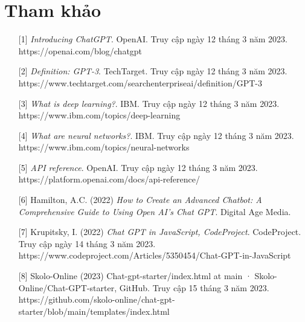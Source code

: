 \documentclass[a4paper, 12pt]{article}
\begin{document}
	\section{Tham khảo}
	\begin{itemize}
		\item[ {[1]} ] \textit{Introducing ChatGPT}. OpenAI. Truy cập ngày 12 tháng 3 năm 2023.\\ https://openai.com/blog/chatgpt 
		
		\item[ {[2]}] \textit{Definition: GPT-3}. TechTarget. Truy cập ngày 12 tháng 3 năm 2023.\\
		https://www.techtarget.com/searchenterpriseai/definition/GPT-3
		
		\item[{[3]}] \textit{What is deep learning?}. IBM. Truy cập ngày 12 tháng 3 năm 2023.\\
		https://www.ibm.com/topics/deep-learning
		
		\item[{[4]}] \textit{What are neural networks?}. IBM. Truy cập ngày 12 tháng 3 năm 2023.\\
		https://www.ibm.com/topics/neural-networks
		
		\item[{[5]}] \textit{API reference}. OpenAI. Truy cập ngày 12 tháng 3 năm 2023.\\
		https://platform.openai.com/docs/api-reference/
		
		\item[{[6]}] Hamilton, A.C. (2022) \textit{How to Create an  Advanced Chatbot: A Comprehensive Guide to Using Open AI's Chat GPT}. Digital Age Media.
		
		\item[{[7]}] Krupitsky, I. (2022) \textit{Chat GPT in JavaScript, CodeProject}. CodeProject. Truy cập ngày 14 tháng 3 năm 2023.\\ https://www.codeproject.com/Articles/5350454/Chat-GPT-in-JavaScript 
		
		\item[{[8]}] Skolo-Online (2023) Chat-gpt-starter/index.html at main · Skolo-Online/Chat-GPT-starter, GitHub. Truy cập 15 tháng 3 năm 2023.\\ https://github.com/skolo-online/chat-gpt-starter/blob/main/templates/index.html 
			
	\end{itemize}
\end{document}
